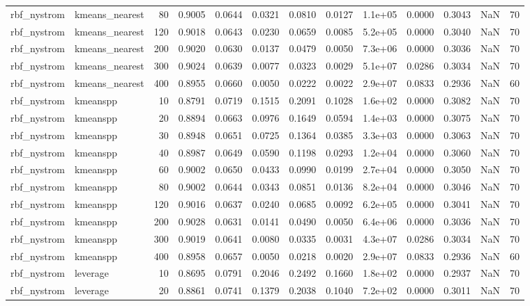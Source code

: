 \begin{table}
\begin{tabular}{llrrrrrrlrrrr}
rbf\_nystrom & kmeans\_nearest & 80 & 0.9005 & 0.0644 & 0.0321 & 0.0810 & 0.0127 & 1.1e+05 & 0.0000 & 0.3043 & NaN & 70 \\
rbf\_nystrom & kmeans\_nearest & 120 & 0.9018 & 0.0643 & 0.0230 & 0.0659 & 0.0085 & 5.2e+05 & 0.0000 & 0.3040 & NaN & 70 \\
rbf\_nystrom & kmeans\_nearest & 200 & 0.9020 & 0.0630 & 0.0137 & 0.0479 & 0.0050 & 7.3e+06 & 0.0000 & 0.3036 & NaN & 70 \\
rbf\_nystrom & kmeans\_nearest & 300 & 0.9024 & 0.0639 & 0.0077 & 0.0323 & 0.0029 & 5.1e+07 & 0.0286 & 0.3034 & NaN & 70 \\
rbf\_nystrom & kmeans\_nearest & 400 & 0.8955 & 0.0660 & 0.0050 & 0.0222 & 0.0022 & 2.9e+07 & 0.0833 & 0.2936 & NaN & 60 \\
rbf\_nystrom & kmeanspp & 10 & 0.8791 & 0.0719 & 0.1515 & 0.2091 & 0.1028 & 1.6e+02 & 0.0000 & 0.3082 & NaN & 70 \\
rbf\_nystrom & kmeanspp & 20 & 0.8894 & 0.0663 & 0.0976 & 0.1649 & 0.0594 & 1.4e+03 & 0.0000 & 0.3075 & NaN & 70 \\
rbf\_nystrom & kmeanspp & 30 & 0.8948 & 0.0651 & 0.0725 & 0.1364 & 0.0385 & 3.3e+03 & 0.0000 & 0.3063 & NaN & 70 \\
rbf\_nystrom & kmeanspp & 40 & 0.8987 & 0.0649 & 0.0590 & 0.1198 & 0.0293 & 1.2e+04 & 0.0000 & 0.3060 & NaN & 70 \\
rbf\_nystrom & kmeanspp & 60 & 0.9002 & 0.0650 & 0.0433 & 0.0990 & 0.0199 & 2.7e+04 & 0.0000 & 0.3050 & NaN & 70 \\
rbf\_nystrom & kmeanspp & 80 & 0.9002 & 0.0644 & 0.0343 & 0.0851 & 0.0136 & 8.2e+04 & 0.0000 & 0.3046 & NaN & 70 \\
rbf\_nystrom & kmeanspp & 120 & 0.9016 & 0.0637 & 0.0240 & 0.0685 & 0.0092 & 6.2e+05 & 0.0000 & 0.3041 & NaN & 70 \\
rbf\_nystrom & kmeanspp & 200 & 0.9028 & 0.0631 & 0.0141 & 0.0490 & 0.0050 & 6.4e+06 & 0.0000 & 0.3036 & NaN & 70 \\
rbf\_nystrom & kmeanspp & 300 & 0.9019 & 0.0641 & 0.0080 & 0.0335 & 0.0031 & 4.3e+07 & 0.0286 & 0.3034 & NaN & 70 \\
rbf\_nystrom & kmeanspp & 400 & 0.8958 & 0.0657 & 0.0050 & 0.0218 & 0.0020 & 2.9e+07 & 0.0833 & 0.2936 & NaN & 60 \\
rbf\_nystrom & leverage & 10 & 0.8695 & 0.0791 & 0.2046 & 0.2492 & 0.1660 & 1.8e+02 & 0.0000 & 0.2937 & NaN & 70 \\
rbf\_nystrom & leverage & 20 & 0.8861 & 0.0741 & 0.1379 & 0.2038 & 0.1040 & 7.2e+02 & 0.0000 & 0.3011 & NaN & 70 \\

\end{tabular}
\end{table}
